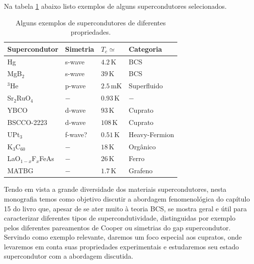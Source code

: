 \documentclass[a4paper,10pt]{article}
\begin{document}
Na tabela \ref{tab:superconductors} abaixo listo exemplos de alguns supercondutores selecionados.

\begin{table}[H]
\begin{center}
\begin{tabular}{ |p{3cm}||p{3cm}|p{3cm}|p{3cm}|  }
\hline
Supercondutor & Simetria & $T_c \simeq$ & Categoria \\
\hline
Hg                   & s-wave    & $4.2   \, \text{K}$      & BCS \\
MgB$_2$              & s-wave    & $39    \, \text{K}$      & BCS \\
$^3$He               & p-wave    & $2.5   \, \text{mK}$     & Superfluido \\
Sr$_2$RuO$_4$        & $-$       & $0.93  \, \text{K}$      & $-$ \\
YBCO                 & d-wave    & $93  \, \text{K}$        & Cuprato \\
BSCCO-2223           & d-wave    & $108   \, \text{K}$      & Cuprato \\
UPt$_3$              & f-wave?   & $0.51  \, \text{K}$      & Heavy-Fermion \\
K$_3$C$_{60}$        & $-$       & $18    \, \text{K}$      & Orgânico  \\
LaO$_{1-x}$F$_x$FeAs & $-$       & $26    \, \text{K}$      & Ferro  \\
MATBG                & $-$       & $1.7    \, \text{K}$     & Grafeno  \\
\hline
\end{tabular}
\end{center}
\caption{Alguns exemplos de supercondutores de diferentes propriedades. }
\label{tab:superconductors}
\end{table}


Tendo em vista a grande diversidade dos materiais supercondutores, nesta monografia temos como objetivo discutir a abordagem fenomenológica do capítulo 15 do livro \cite{coleman} que, apesar de se ater muito à teoria BCS, se mostra geral e útil para caracterizar diferentes tipos de supercondutividade, distinguidas por exemplo pelos diferentes pareamentos de Cooper ou simetrias do gap supercondutor. Servindo como exemplo relevante, daremos um foco especial aos cupratos, onde levaremos em conta suas propriedades experimentais e estudaremos seu estado supercondutor com a abordagem discutida.

\end{document}
